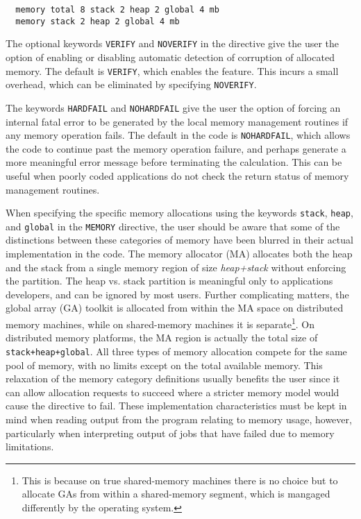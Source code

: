 \begin{verbatim}
  memory total 8 stack 2 heap 2 global 4 mb
  memory stack 2 heap 2 global 4 mb
\end{verbatim}

The optional keywords \verb+VERIFY+ and \verb+NOVERIFY+ 
in the directive give the user the option
of enabling or disabling automatic
detection of corruption of allocated memory.  The default is \verb+VERIFY+,
which enables the feature. This incurs a small overhead, which can be 
eliminated by
specifying \verb+NOVERIFY+.  

The keywords \verb+HARDFAIL+ and \verb+NOHARDFAIL+  give the user the
option of forcing an internal fatal error to be generated by the local
memory management routines if any memory operation fails.  The default
in the code is \verb+NOHARDFAIL+, which allows the code to continue past
the memory operation failure, and perhaps generate a more meaningful error
message before terminating the calculation.   This can be useful when
poorly coded applications do not check the return status of memory
management routines.


When specifying the specific memory allocations using the keywords
\verb+stack+, \verb+heap+, and \verb+global+ in the \verb+MEMORY+
directive, the user should be aware that some of the distinctions between 
these categories of memory have been blurred in their actual implementation 
in the code.  The memory allocator
(MA) allocates both the heap and the stack from a single memory region
of size {\em heap+stack} without enforcing the partition.  The heap
vs. stack partition is meaningful only to applications
developers, and can be ignored by most users.  Further complicating matters,
the global array (GA) toolkit is allocated from within the MA space on
distributed memory machines, while on shared-memory machines it is
separate\footnote{This is because on true shared-memory machines there
is no choice but to allocate GAs from within a shared-memory segment,
which is mangaged differently by the operating system.}.  On
distributed memory platforms, the MA region is actually the total size of
{\tt stack+heap+global}.  All three types of memory allocation compete
for the same pool of memory, with no limits except on the total
available memory.  This relaxation of the memory category definitions 
usually benefits the user since it can allow allocation requests to 
succeed where a stricter memory model would cause the directive to fail.  
These implementation characteristics must be kept in mind when
reading output from the program relating to memory usage, however,
particularly when interpreting output of jobs that have
failed due to memory limitations.

